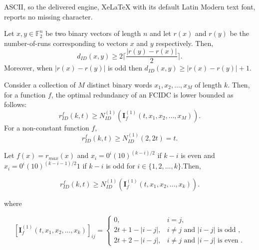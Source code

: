 \documentclass[10pt,a4paper]{amsart}
\begin{document}
ASCII, so the delivered engine, XeLaTeX with its default Latin Modern text font, reports no missing character.
    \begin{lemma}\label{run_insdel_bound}
        Let $x,y \in \mathbb{F}_2^n$ be two binary vectors of length $n$ and let $r(x)$ and $r(y)$ be the number-of-runs corresponding to vectors $x$ and $y$ respectively. Then,
        $$ d_{ID}(x,y) \ge 2 \Big\lceil \frac{|r(y) - r(x)|}{2} \Big\rceil.$$
        Moreover, when $|r(x) - r(y)|$ is odd then $d_{ID}(x,y)\geq |r(x) - r(y)| + 1.$
    \end{lemma}

    \begin{corollary}\label{lower_bound_red}
        Consider a collection of $M$ distinct binary words $x_1, x_2, \ldots, x_M$ of length $k$. Then, for a function $f$, the optimal redundancy of an FCIDC is lower bounded as follows:
        $$ r^f_{ID}(k, t) \geq N^{(1)}_{ID}(\boldsymbol{I}_f^{(1)}(t, x_1,x_2, \ldots,x_{M})).$$
        For a non-constant function $f$, 
        $$ r^f_{ID}(k, t) \geq N^{(1)}_{ID}(2, 2t) = t. $$
    \end{corollary}

    \begin{lemma}\label{max_lower_bound}
        Let $f(x) = r_{max}(x)$ and $x_i =0^i(10)^{(k-i)/2}$ if $k-i$ is even and $x_i =0^i(10)^{(k-i-1)/2}1$ if $k-i$ is odd for $i \in \{1,2,\ldots,k\}$.Then,
        
          \[
            r_{ID}^f(k,t) \geq N_{ID}^{(1)}(\boldsymbol{I}_f^{(1)}(t, x_1, x_2, \ldots, x_k)).
          \]  
        
        where
        
        \[
            [\boldsymbol{I}_f^{(1)}(t, x_1, x_2, \ldots, x_k)]_{ij}=
            \begin{cases}
                0,  & i = j, \\[4pt]
                2t + 1 - |i - j| , & i \neq j \text{ and } |i-j| \text{ is odd },\\
                2t + 2 - |i-j|,    & i \neq j \text{ and } |i-j| \text{ is even }. 
            \end{cases}
        \]
        
    \end{lemma}
\end{document}
